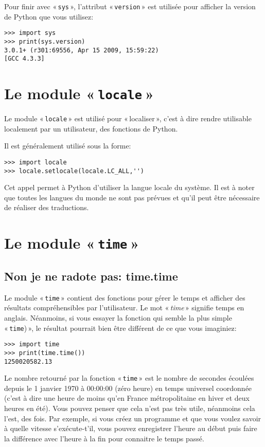 Pour finir avec « \texttt{sys} », l'attribut « \verb+version+ » est utilisée pour afficher la version de Python que vous utilisez:

\begin{Verbatim}[frame=single,rulecolor=\color{gray}]
>>> import sys
>>> print(sys.version)
3.0.1+ (r301:69556, Apr 15 2009, 15:59:22) 
[GCC 4.3.3]
\end{Verbatim}

\section{Le module « \texttt{locale} »}
Le module « \texttt{locale} » est utilisé pour « localiser », c'est à dire rendre utilisable localement par un utilisateur, des fonctions de Python.

Il est généralement utilisé sous la forme:
\begin{Verbatim}[frame=single,rulecolor=\color{gray}]
>>> import locale
>>> locale.setlocale(locale.LC_ALL,'')
\end{Verbatim}

Cet appel permet à Python d'utiliser la langue locale du système. Il est à noter que toutes les langues du monde ne sont pas prévues et qu'il peut être nécessaire de réaliser des traductions.

\section{Le module « \texttt{time} »}
\subsection{Non je ne radote pas: time.time }

Le module « \texttt{time} » contient des fonctions pour gérer le temps et afficher des résultats compréhensibles par l'utilisateur. Le mot « \emph{time} » signifie temps en anglais. Néanmoins, si vous essayer la fonction qui semble la plus simple « \verb+time+) », le résultat pourrait bien être différent de ce que vous imaginiez:

\begin{Verbatim}[frame=single,rulecolor=\color{gray}]
>>> import time
>>> print(time.time())
1250020582.13
\end{Verbatim}

Le nombre retourné par la fonction « \texttt{time} »  est le nombre de secondes écoulées depuis le 1 janvier 1970 à 00:00:00 (zéro heure) en temps universel coordonnée (c'est à dire une heure de moins qu'en France métropolitaine en hiver et deux heures en été). Vous pouvez penser que cela n'est pas très utile, néanmoins cela l'est, des fois. Par exemple, si vous créez un programme et que vous voulez savoir à quelle vitesse s'exécute-t'il, vous pouvez enregistrer l'heure au début puis faire la différence avec l'heure à la fin pour connaitre le temps passé.

